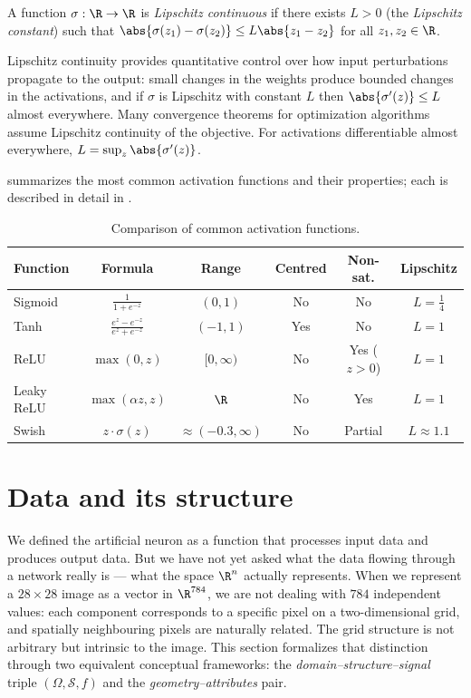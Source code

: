 \begin{definition}
\label{def:found:lipschitz}
A function $\sigma : \R \to \R$ is \emph{Lipschitz continuous} if there exists
$L > 0$ (the \emph{Lipschitz constant}) such that
$\abs{\sigma(z_1) - \sigma(z_2)} \le L\abs{z_1 - z_2}$ for all $z_1, z_2 \in \R$.
\end{definition}

Lipschitz continuity provides quantitative control over how input perturbations
propagate to the output: small changes in the weights produce bounded changes in
the activations, and if $\sigma$ is Lipschitz with constant $L$ then
$\abs{\sigma'(z)} \le L$ almost everywhere. Many convergence theorems for
optimization algorithms assume Lipschitz continuity of the objective. For
activations differentiable almost everywhere,
$L = \sup_z \abs{\sigma'(z)}$.

 summarizes the most common activation functions and
their properties; each is described in detail in
.

\begin{table}[h]
\centering
\caption{Comparison of common activation functions.}
\label{tab:found:activations}
\begin{tabular}{@{}lccccc@{}}
\toprule
\textbf{Function} & \textbf{Formula} & \textbf{Range} & \textbf{Centred} & \textbf{Non-sat.} & \textbf{Lipschitz} \\
\midrule
Sigmoid & $\frac{1}{1+e^{-z}}$ & $(0,1)$ & No & No & $L=\frac{1}{4}$ \\
\addlinespace
Tanh & $\frac{e^z-e^{-z}}{e^z+e^{-z}}$ & $(-1,1)$ & Yes & No & $L=1$ \\
\addlinespace
ReLU & $\max(0,z)$ & $[0,\infty)$ & No & Yes ($z>0$) & $L=1$ \\
\addlinespace
Leaky ReLU & $\max(\alpha z,z)$ & $\R$ & No & Yes & $L=1$ \\
\addlinespace
Swish & $z \cdot \sigma(z)$ & $\approx(-0.3,\infty)$ & No & Partial & $L\approx 1.1$ \\
\bottomrule
\end{tabular}
\end{table}

\section{Data and its structure}
\label{sec:found:data}

We defined the artificial neuron as a function that processes input data and
produces output data. But we have not yet asked what the data flowing through a
network really is --- what the space $\R^n$ actually represents. When we
represent a $28 \times 28$ image as a vector in $\R^{784}$, we are not dealing
with $784$ independent values: each component corresponds to a specific pixel on
a two-dimensional grid, and spatially neighbouring pixels are naturally related.
The grid structure is not arbitrary but intrinsic to the image. This section
formalizes that distinction through two equivalent conceptual frameworks: the
\emph{domain--structure--signal} triple $(\Omega, \mathcal{S}, f)$ and the
\emph{geometry--attributes} pair.

